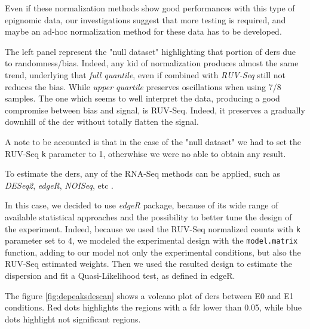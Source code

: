 Even if these normalization methods show good performances with this type of epignomic data, our investigations suggest that more testing is required, and maybe an ad-hoc normalization method for these data has to be developed.

The left panel represent the "null dataset" highlighting that portion of \glspl{der} due to randomness/bias. Indeed, any kid of normalization produces almost the same trend, underlying that \textit{full quantile}, even if combined with \textit{RUV-Seq} still not reduces the bias.
While \textit{upper quartile} preserves oscillations when using 7/8 samples.
The one which seems to well interpret the data, producing a good compromise between bias and signal, is RUV-Seq.
Indeed, it preserves a gradually downhill of the \gls{der} without totally flatten the signal.

A note to be accounted is that in the case of the "null dataset" we had to set the RUV-Seq \lstinline!k! parameter to 1, otherwhise we were no able to obtain any result.

To estimate the \glspl{der}, any of the RNA-Seq methods can be applied, such as \textit{DESeq2}, \textit{edgeR}, \textit{NOISeq}, etc \cite{Robinson2009, McCarthy2012, Tarazona2012}.

In this case, we decided to use \textit{edgeR} package, because of its wide range of  available statistical approaches and the possibility to better tune the design of the experiment. 
Indeed, because we used the RUV-Seq normalized counts with \lstinline!k! parameter set to 4, we modeled the experimental design with the \lstinline!model.matrix! function, adding to our model not only the experimental conditions, but also the RUV-Seq estimated weights.
Then we used the resulted design to estimate the dispersion and fit a Quasi-Likelihood test, as defined in edgeR\cite{Robinson2009}.

The figure \ref{fig:depeaksdescan} shows a volcano plot of \glspl{der} between E0 and E1 conditions.
Red dots highlights the regions with a \gls{fdr}\cite{Benjamini1995} lower than 0.05, while blue dots highlight not significant regions.
 
